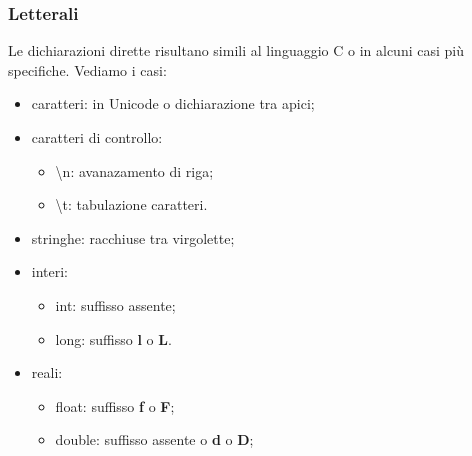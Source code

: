 \documentclass{subfiles}
\begin{document}
\subsubsection{Letterali}
Le dichiarazioni dirette risultano simili al linguaggio C o in alcuni casi più specifiche. Vediamo i casi:
\begin{itemize}
    \item caratteri: in Unicode o dichiarazione tra apici;
    \item caratteri di controllo:
          \begin{itemize}
              \item \textbackslash n: avanazamento di riga;
              \item \textbackslash t: tabulazione caratteri.
          \end{itemize}
    \item stringhe: racchiuse tra virgolette;
    \item interi:
          \begin{itemize}
              \item int: suffisso assente;
              \item long: suffisso \textbf{l} o \textbf{L}.
          \end{itemize}
    \item reali:
          \begin{itemize}
              \item float: suffisso \textbf{f} o \textbf{F};
              \item double: suffisso assente o \textbf{d} o \textbf{D};
          \end{itemize}

\end{itemize}
\end{document}
